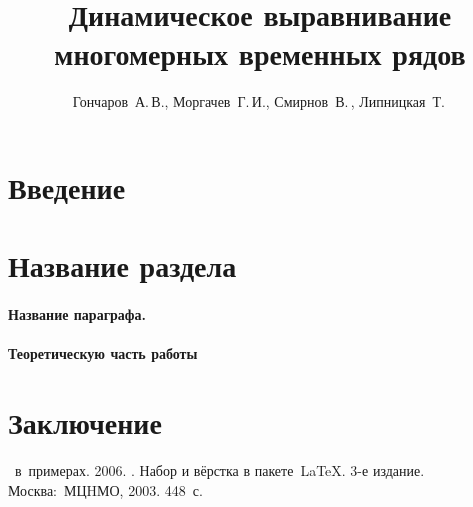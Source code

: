\documentclass[12pt,twoside]{article}
\title
        {Динамическое выравнивание многомерных временных рядов}
\author
        {Гончаров~А.\,В., Моргачев~Г.\,И., Смирнов~В.\,, Липницкая~Т.\,} %
\begin{document}
    \maketitle
    \section{Введение}
    \section{Название раздела}
    \paragraph{Название параграфа.}
    \paragraph{Теоретическую часть работы}
    \section{Заключение}

    
    

    \begin{thebibliography}{1}
       \LaTeXe\ в~примерах.
       2006.
       .
        Набор и вёрстка в пакете~\LaTeX.
       3-е издание.
       Москва:~МЦHМО, 2003.  448~с.
    \end{thebibliography}
    
    
\end{document}
